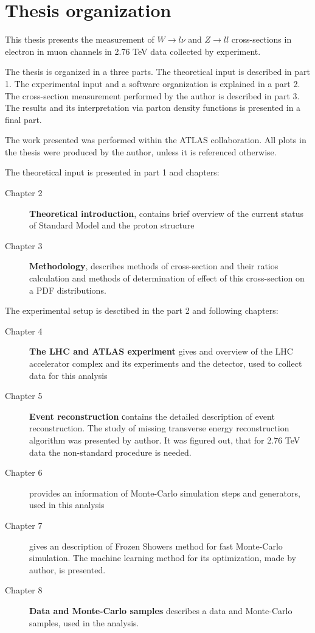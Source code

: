 \chapter{Thesis organization}
This thesis presents the measurement of $W\to l\nu$ and $Z\to ll$ cross-sections in electron in muon channels in 2.76 TeV data collected by \atlas experiment.

The thesis is organized in a three parts. The theoretical input is described in part 1. The experimental input and a software organization is explained in a part 2. The cross-section measurement performed by the author is described in part 3. The results and its interpretation via parton density functions is presented in a final part.

The work presented was performed within the ATLAS collaboration. All plots in the thesis were produced by the author, unless it is referenced otherwise. 

The theoretical input is presented in part 1 and chapters:
\begin{description}
\item [Chapter 2] \textbf{Theoretical introduction}, contains brief overview of the current status of Standard Model and the proton structure
\item [Chapter 3] \textbf{Methodology}, describes methods of cross-section and their ratios calculation and methods of determination of effect of this cross-section on a PDF distributions.
\end{description}

The experimental setup is desctibed in the part 2 and following chapters:
\begin{description}
\item [Chapter 4] \textbf{The LHC and ATLAS experiment} gives and overview of the LHC accelerator complex and its experiments and the \atlas detector, used to collect data for this analysis
\item [Chapter 5] \textbf{Event reconstruction} сontains the detailed description of event reconstruction. The study of missing transverse energy reconstruction algorithm was presented by author. It was figured out, that for 2.76 TeV data the non-standard procedure is needed. 
\item [Chapter 6]  provides an information of Monte-Carlo simulation steps and generators, used in this analysis
\item [Chapter 7]  gives an description of Frozen Showers method for fast Monte-Carlo simulation. The machine learning method for its optimization, made by author, is presented.
\item [Chapter 8] \textbf{Data and Monte-Carlo samples} describes a data and Monte-Carlo samples, used in the analysis.
\end{description}

